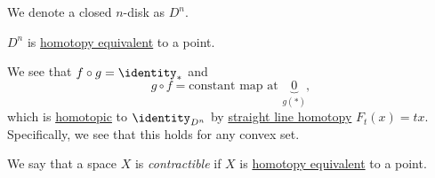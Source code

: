 \begin{notation}
	We denote a closed \(n\)-disk as \(D^n\).
\end{notation}
\begin{eg}
	\(D^n\) is \hyperref[def:homotopy-equivalence]{homotopy equivalent} to a point.
	\begin{figure}[H]
		\centering
		\label{fig:eg:closed-disk-eq-point}
	\end{figure}

	We see that \(f\circ g = \identity_\ast\) and
	\[
		g\circ f = \text{constant map at }\underbrace{0}_{g(\ast)},
	\]
	which is \hyperref[def:homotopic]{homotopic} to \(\identity_{D^n}\) by
	\hyperref[eg:lec1:straight-line-homotopy]{straight line homotopy} \(F_t(x) = tx\). Specifically, we see that this holds for any convex set.
\end{eg}

\begin{definition}[Contractible]\label{def:contractible}
	We say that a space \(X\) is \emph{contractible} if \(X\) is \hyperref[def:homotopy-equivalence]{homotopy equivalent}
	to a point.
\end{definition}

